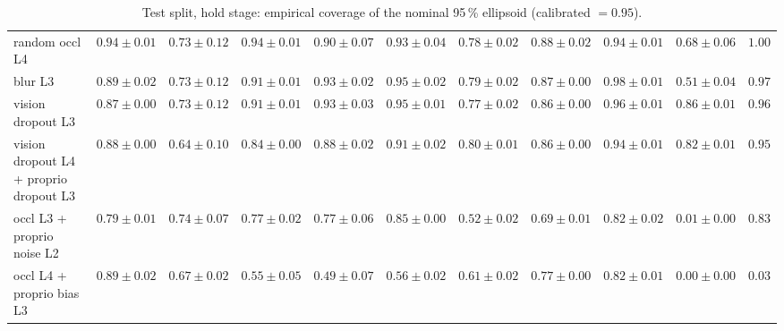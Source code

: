 \begin{table}[p]
{\begin{tabular}{lrrrrrrrrrr}
random occl L4 & $0.94{\pm}0.01$ & $0.73{\pm}0.12$ & $0.94{\pm}0.01$ & $0.90{\pm}0.07$ & $0.93{\pm}0.04$ & $0.78{\pm}0.02$ & $0.88{\pm}0.02$ & $0.94{\pm}0.01$ & $0.68{\pm}0.06$ & $1.00$ \\
blur L3 & $0.89{\pm}0.02$ & $0.73{\pm}0.12$ & $0.91{\pm}0.01$ & $0.93{\pm}0.02$ & $0.95{\pm}0.02$ & $0.79{\pm}0.02$ & $0.87{\pm}0.00$ & $0.98{\pm}0.01$ & $0.51{\pm}0.04$ & $0.97$ \\
vision dropout L3 & $0.87{\pm}0.00$ & $0.73{\pm}0.12$ & $0.91{\pm}0.01$ & $0.93{\pm}0.03$ & $0.95{\pm}0.01$ & $0.77{\pm}0.02$ & $0.86{\pm}0.00$ & $0.96{\pm}0.01$ & $0.86{\pm}0.01$ & $0.96$ \\
vision dropout L4 {+} proprio dropout L3 & $0.88{\pm}0.00$ & $0.64{\pm}0.10$ & $0.84{\pm}0.00$ & $0.88{\pm}0.02$ & $0.91{\pm}0.02$ & $0.80{\pm}0.01$ & $0.86{\pm}0.00$ & $0.94{\pm}0.01$ & $0.82{\pm}0.01$ & $0.95$ \\
occl L3 {+} proprio noise L2 & $0.79{\pm}0.01$ & $0.74{\pm}0.07$ & $0.77{\pm}0.02$ & $0.77{\pm}0.06$ & $0.85{\pm}0.00$ & $0.52{\pm}0.02$ & $0.69{\pm}0.01$ & $0.82{\pm}0.02$ & $0.01{\pm}0.00$ & $0.83$ \\
occl L4 {+} proprio bias L3 & $0.89{\pm}0.02$ & $0.67{\pm}0.02$ & $0.55{\pm}0.05$ & $0.49{\pm}0.07$ & $0.56{\pm}0.02$ & $0.61{\pm}0.02$ & $0.77{\pm}0.00$ & $0.82{\pm}0.01$ & $0.00{\pm}0.00$ & $0.03$ \\
\bottomrule\end{tabular}}
\caption{Test split, hold stage: empirical coverage of the nominal 95\,\% ellipsoid (calibrated $=0.95$).}\label{tab:app_cov}\end{table}


